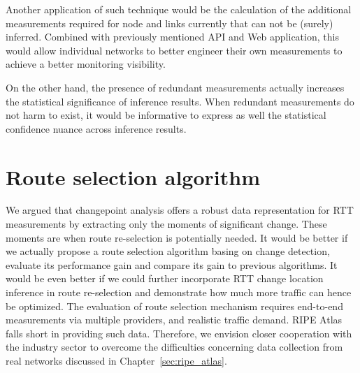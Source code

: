 Another application of such technique would be the calculation of the additional measurements required for node and links currently that can not be (surely) inferred. Combined with previously mentioned API and Web application, this would allow individual networks to better engineer their own measurements to achieve a better monitoring visibility. 

On the other hand, the presence of redundant measurements actually increases the statistical significance of inference results. When redundant measurements do not harm to exist, it would be informative to express as well the statistical confidence nuance across inference results.

\section{Route selection algorithm}
We argued that changepoint analysis offers a robust data representation for RTT measurements by extracting only the moments of significant change. These moments are when route re-selection is potentially needed. It would be better if we actually propose a route selection algorithm basing on change detection, evaluate its performance gain and compare its gain to previous algorithms.
It would be even better if we could further incorporate RTT change location inference in route re-selection and demonstrate how much more traffic can hence be optimized.
The evaluation of route selection mechanism requires end-to-end measurements via multiple providers, and realistic traffic demand.
RIPE Atlas falls short in providing such data.
Therefore, we envision closer cooperation with the industry sector to overcome the difficulties concerning data collection from real networks discussed in Chapter~\ref{sec:ripe_atlas}.
 